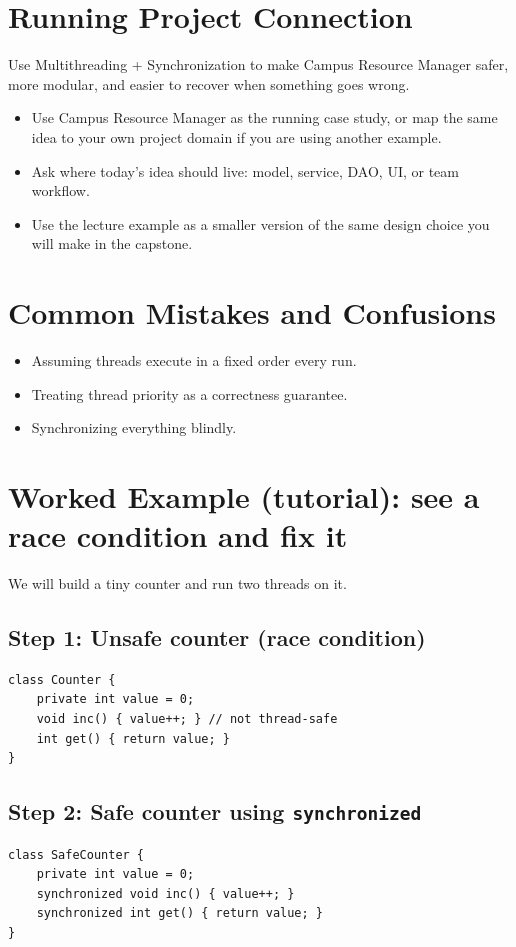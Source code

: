 \documentclass[11pt]{article}
\begin{document}
\notesources{\OOPSUnitIIISources}

\section{Running Project Connection}
Use Multithreading + Synchronization to make Campus Resource Manager safer, more modular, and easier to recover when something goes wrong.
\begin{itemize}
  \item Use Campus Resource Manager as the running case study, or map the same idea to your own project domain if you are using another example.
  \item Ask where today's idea should live: model, service, DAO, UI, or team workflow.
  \item Use the lecture example as a smaller version of the same design choice you will make in the capstone.
\end{itemize}
\notesources{\OOPSUnitIIISources}

\section{Common Mistakes and Confusions}
\begin{itemize}
  \item Assuming threads execute in a fixed order every run.
  \item Treating thread priority as a correctness guarantee.
  \item Synchronizing everything blindly.
\end{itemize}
\notesources{\OOPSUnitIIISources}

\section{Worked Example (tutorial): see a race condition and fix it}
We will build a tiny counter and run two threads on it.

\subsection*{Step 1: Unsafe counter (race condition)}
\begin{lstlisting}
class Counter {
    private int value = 0;
    void inc() { value++; } // not thread-safe
    int get() { return value; }
}
\end{lstlisting}

\subsection*{Step 2: Safe counter using \texttt{synchronized}}
\begin{lstlisting}
class SafeCounter {
    private int value = 0;
    synchronized void inc() { value++; }
    synchronized int get() { return value; }
}
\end{lstlisting}
\end{document}
